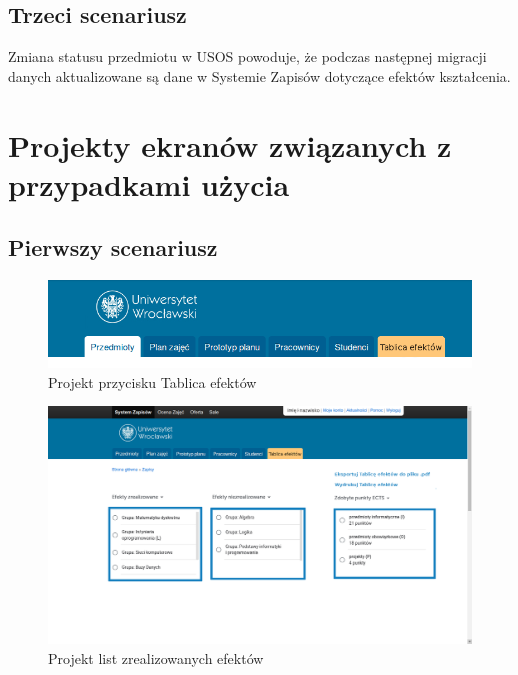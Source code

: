 \documentclass{article}
\begin{document}
\subsection{Trzeci scenariusz}
Zmiana statusu przedmiotu w USOS powoduje, że podczas następnej migracji danych aktualizowane są dane w Systemie Zapisów dotyczące efektów kształcenia.


\newpage


\section{Projekty ekranów związanych z przypadkami użycia}
\subsection{Pierwszy scenariusz}
\begin{figure}[H]
	\begin{center}
		\includegraphics[scale=0.45]{te.png}
		\caption{Projekt przycisku Tablica efektów}
	\end{center}
\end{figure}

\begin{figure}[H]
	\begin{center}
		\includegraphics[scale=0.23]{tabl.png}
		\caption{Projekt list zrealizowanych efektów}
	\end{center}
\end{figure}
\end{document}
